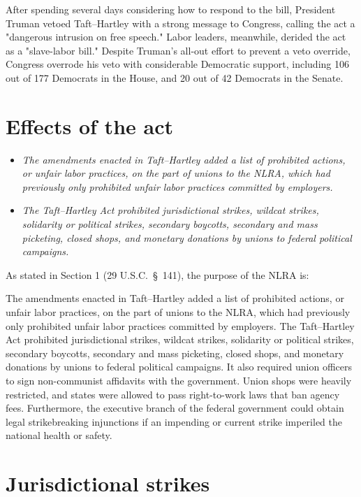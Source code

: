 After spending several days considering how to respond to the bill,
President Truman vetoed Taft--Hartley with a strong message to Congress,
calling the act a "dangerous intrusion on free speech." Labor leaders,
meanwhile, derided the act as a "slave-labor bill." Despite Truman's
all-out effort to prevent a veto override, Congress overrode his veto
with considerable Democratic support, including 106 out of 177 Democrats
in the House, and 20 out of 42 Democrats in the Senate.

\section{Effects of the act}\label{effects-of-the-act}

\begin{itemize}
\item
  \emph{The amendments enacted in Taft--Hartley added a list of
  prohibited actions, or unfair labor practices, on the part of unions
  to the NLRA, which had previously only prohibited unfair labor
  practices committed by employers.}
\item
  \emph{The Taft--Hartley Act prohibited jurisdictional strikes, wildcat
  strikes, solidarity or political strikes, secondary boycotts,
  secondary and mass picketing, closed shops, and monetary donations by
  unions to federal political campaigns.}
\end{itemize}

As stated in Section 1 (29 U.S.C.~§~141), the purpose of the NLRA is:

The amendments enacted in Taft--Hartley added a list of prohibited
actions, or unfair labor practices, on the part of unions to the NLRA,
which had previously only prohibited unfair labor practices committed by
employers. The Taft--Hartley Act prohibited jurisdictional strikes,
wildcat strikes, solidarity or political strikes, secondary boycotts,
secondary and mass picketing, closed shops, and monetary donations by
unions to federal political campaigns. It also required union officers
to sign non-communist affidavits with the government. Union shops were
heavily restricted, and states were allowed to pass right-to-work laws
that ban agency fees. Furthermore, the executive branch of the federal
government could obtain legal strikebreaking injunctions if an impending
or current strike imperiled the national health or safety.

\section{Jurisdictional strikes}\label{jurisdictional-strikes}

